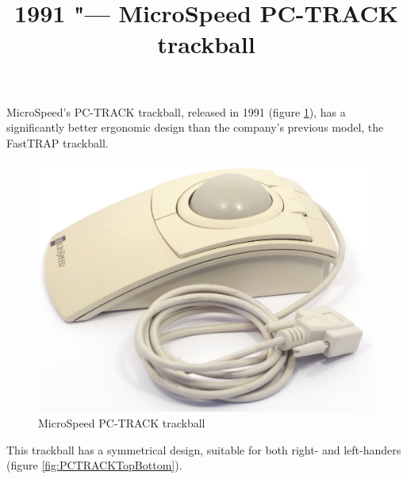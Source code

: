 \documentclass[11pt, a4paper]{article}
\begin{document}
\title{1991 "--- MicroSpeed PC-TRACK trackball}
\date{}
\maketitle

MicroSpeed's PC-TRACK trackball, released in 1991 (figure \ref{fig:PCTRACKPic}), has a significantly better ergonomic design than the company's previous model, the FastTRAP trackball.

\begin{figure}[h]
    \centering
    \includegraphics[scale=0.4]{1991_microspeed_pc-track/pic_30.jpg}
    \caption{MicroSpeed PC-TRACK trackball}
    \label{fig:PCTRACKPic}
\end{figure}

This trackball has a symmetrical design, suitable for both right- and left-handers (figure \ref{fig:PCTRACKTopBottom}). 
\end{document}
